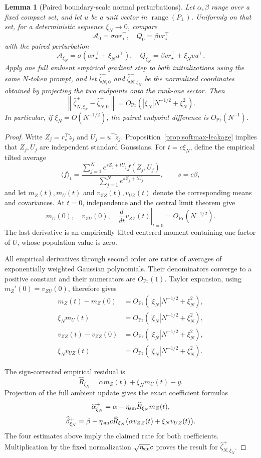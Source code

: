 \documentclass[11pt]{article}
\newtheorem{lemma}[theorem]{Lemma}
\begin{document}
\begin{lemma}[Paired boundary-scale normal perturbations]
\label{lem:softmax-paired-perturbation}
Let \(\alpha,\beta\) range over a fixed compact set, and let \(u\) be a unit
vector in \(\operatorname{range}(P_\perp)\).  Uniformly on that set, for a
deterministic sequence \(\xi_N\to0\), compare
\[
\mathcal A_{0}=\sigma\alpha r_\star^\top,\quad
Q_{0}=\beta vr_\star^\top
\]
with the paired perturbation
\[
\mathcal A_{\xi_N}
=\sigma(\alpha r_\star^\top+\xi_Nu^\top),\quad
Q_{\xi_N}
=\beta vr_\star^\top+\xi_Nvu^\top.
\]
Apply one full ambient empirical gradient step to both initializations using
the same \(N\)-token prompt, and let
\(\widehat\zeta^+_{N,0}\) and
\(\widehat\zeta^+_{N,\xi_N}\) be the normalized coordinates obtained by
projecting the two endpoints onto the rank-one sector.  Then
\[
\left\|
\widehat\zeta^+_{N,\xi_N}
-\widehat\zeta^+_{N,0}
\right\|
=O_{\Pr}\!\left(
|\xi_N|N^{-1/2}+\xi_N^2
\right).
\]
In particular, if \(\xi_N=O(N^{-1/2})\), the paired endpoint difference is
\(O_{\Pr}(N^{-1})\).
\end{lemma}

\begin{proof}
Write \(Z_j=r_\star^\top\widetilde z_j\) and
\(U_j=u^\top\widetilde z_j\).  Proposition~\ref{prop:softmax-leakage}
implies that \(Z_j,U_j\) are independent standard Gaussians.  For
\(t=c\xi_N\), define the empirical tilted average
\[
\langle f\rangle_t
=
\frac{\sum_{j=1}^N e^{sZ_j+tU_j}f(Z_j,U_j)}
{\sum_{j=1}^N e^{sZ_j+tU_j}},
\qquad s=c\beta,
\]
and let \(m_Z(t),m_U(t)\) and
\(v_{ZZ}(t),v_{UZ}(t)\) denote the corresponding means and covariances.
At \(t=0\), independence and the central limit theorem give
\[
m_U(0),\quad v_{ZU}(0),\quad
\left.\frac{d}{dt}v_{ZZ}(t)\right|_{t=0}
=O_{\Pr}(N^{-1/2}).
\]
The last derivative is an empirically tilted centered moment containing one
factor of \(U\), whose population value is zero.

All empirical derivatives through second order are ratios of averages of
exponentially weighted Gaussian polynomials.  Their denominators converge to
a positive constant and their numerators are \(O_{\Pr}(1)\).  Taylor
expansion, using \(m_Z'(0)=v_{ZU}(0)\), therefore gives
\begin{align*}
m_Z(t)-m_Z(0)
&=O_{\Pr}(|\xi_N|N^{-1/2}+\xi_N^2),\\
\xi_Nm_U(t)
&=O_{\Pr}(|\xi_N|N^{-1/2}+\xi_N^2),\\
v_{ZZ}(t)-v_{ZZ}(0)
&=O_{\Pr}(|\xi_N|N^{-1/2}+\xi_N^2),\\
\xi_Nv_{UZ}(t)
&=O_{\Pr}(|\xi_N|N^{-1/2}+\xi_N^2).
\end{align*}

The sign-corrected empirical residual is
\[
\widehat R_{\xi_N}
=\alpha m_Z(t)+\xi_Nm_U(t)-\bar y.
\]
Projection of the full ambient update gives the exact coefficient formulas
\[
\widehat\alpha_{\xi_N}^+
=\alpha-\eta_{\rm sm}\widehat R_{\xi_N}m_Z(t),
\]
\[
\widehat\beta_{\xi_N}^+
=\beta-\eta_{\rm sm}c\widehat R_{\xi_N}
\bigl(\alpha v_{ZZ}(t)+\xi_Nv_{UZ}(t)\bigr).
\]
The four estimates above imply the claimed rate for both coefficients.
Multiplication by the fixed normalization
\(\sqrt{\eta_{\rm sm}}c\) proves the result for
\(\widehat\zeta^+_{N,\xi_N}\).
\end{proof}
\end{document}
